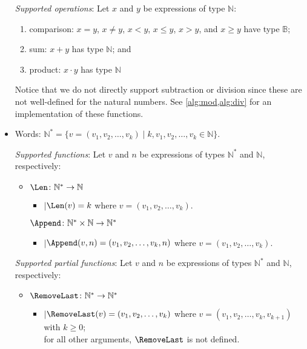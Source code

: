 \documentclass[11pt,a4paper,reqno]{amsart}
\theoremstyle{plain}
\theoremstyle{definition}
\theoremstyle{definition}
\renewcommand\leq\leqslant
\renewcommand\geq\geqslant
\newenvironment{indentline}{\begin{itemize}[leftmargin=1em]\item[]}{\end{itemize}}
\newcommand\hl[1]{\colorbox{gray!10}{#1}}
\begin{document}
\begin{itemize}[leftmargin=2em]
	      \smallskip
	      \noindent
	      \textit{Supported operations}:
	      Let $x$ and $y$ be expressions of type $\mathbb N$:
	      \begin{enumerate}
		      \item comparison:
            \hl{$x = y$},
            \hl{$x \neq y$},
                  \hl{$x < y$},
                  \hl{$x \leq y$},
                  \hl{$x > y$}, and
                  \hl{$x \geq y$}
		            have type $\mathbb B$;
          \item sum: \hl{$x+y$} has type $\mathbb N$; and
          \item product: \hl{$x\cdot y$} has type $\mathbb N$
	      \end{enumerate}
	      Notice that we do not directly support subtraction or division since these are not well-defined for the natural numbers.
        See \cref{alg:mod,alg:div} for an implementation of these functions.

        \medskip

      \item Words: $\mathbb N^* = \{v = (v_1,v_2,\ldots,v_k) \mid k,v_1,v_2,\ldots,v_k\in \mathbb N \}$.

        \smallskip
        \noindent
        \textit{Supported functions}:
        Let $v$ and $n$ be expressions of types $\mathbb N^*$ and $\mathbb N$, respectively:
        \begin{indentline}
          $\Len\colon \mathbb N^*\to\mathbb N$
          \begin{indentline}
            $\mid$\quad $\Len(v) = k$ where $v = (v_1,v_2,\ldots,v_k)$.
          \end{indentline}

          \smallskip
          \noindent
          $\Append\colon \mathbb N^* \times \mathbb N \to \mathbb N^*$
          \begin{indentline}
            $\mid$\quad $\Append(v,n) = (v_1,v_2,\ldots,v_k,n)$ where $v = (v_1,v_2,\ldots,v_k)$.
          \end{indentline}
        \end{indentline}

        \smallskip
        \noindent
        \textit{Supported partial functions}:
        Let $v$ and $n$ be expressions of types $\mathbb N^*$ and $\mathbb N$, respectively:
        \begin{indentline}
          \smallskip
          \noindent
          $\RemoveLast\colon \mathbb N^*\to \mathbb N^*$
          \begin{indentline}
            $\mid$\quad $\RemoveLast(v) = (v_1,v_2,\ldots,v_{k})$ where $v = (v_1,v_2,\ldots,v_k,v_{k+1})$ with $k\geq 0$;\\
            \phantom{$\mid$\quad }for all other arguments, $\RemoveLast$ is not defined.
          \end{indentline}


\end{indentline}
\end{itemize}
\end{document}
